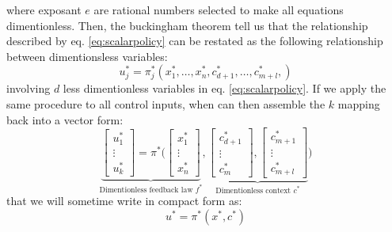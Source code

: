 where exposant $e$ are rational numbers selected to make all equations dimentionless. Then, the buckingham theorem tell us that the relationship described by eq. \eqref{eq:scalarpolicy} can be restated as the following relationship between  dimentionsless variables:
\begin{equation}
u_j^* = \pi_j^* \left(
x_1^*, \hdots, x_n^*, 
c_{d+1}^*, \hdots, c_{m+l}^*, 
\right) 
\label{eq:scalardimpolicy}
\end{equation}
involving $d$ less dimentionless variables in eq. \eqref{eq:scalarpolicy}. If we apply the same procedure to all control inputs, when can then assemble the $k$ mapping back into a vector form:
\begin{equation}
\underbrace{
\begin{bmatrix}
u_1^* \\
\vdots \\
u_k^*
\end{bmatrix}
=
\pi^* \Biggl(
\begin{bmatrix}
x_1^* \\
\vdots \\
x_n^*
\end{bmatrix}
}_{\text{Dimentionless feedback law $f^*$}}
,
\underbrace{
\begin{bmatrix}
c_{d+1}^* \\
\vdots \\
c_{m}^*
\end{bmatrix}
,
\begin{bmatrix}
c_{m+1}^* \\
\vdots \\
c_{m+l}^*
\end{bmatrix}
}_{\text{Dimentionless context $c^*$}}
\Biggr)
\label{eq:vectordimpolicy}
\end{equation}
that we will sometime write in compact form as: 
\begin{equation}
u^* = \pi^*( x^* , c^* )
\label{eq:vectordimpolicyshort}
\end{equation}
